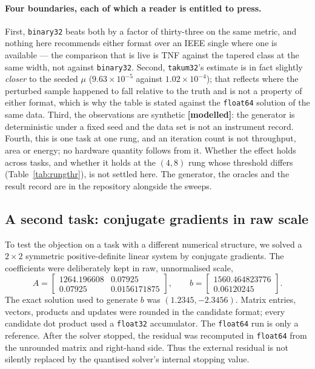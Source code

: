 \paragraph{Four boundaries, each of which a reader is entitled to press.}
First, \texttt{binary32} beats both by a factor of thirty-three on the same
metric, and nothing here recommends either format over an IEEE single where one is
available --- the comparison that is live is TNF against the tapered class at the
same width, not against \texttt{binary32}. Second, \texttt{takum32}'s estimate is
in fact slightly \emph{closer} to the seeded $\mu$ ($9.63\times 10^{-5}$ against
$1.02\times 10^{-4}$); that reflects where the perturbed sample happened to fall
relative to the truth and is not a property of either format, which is why the
table is stated against the \texttt{float64} solution of the same data. Third, the
observations are synthetic \textbf{[modelled]}: the generator is deterministic
under a fixed seed and the data set is not an instrument record. Fourth, this is
one task at one rung, and an iteration count is not throughput, area or energy;
no hardware quantity follows from it. Whether the effect holds across tasks, and
whether it holds at the $(4,8)$ rung whose threshold differs
(Table~\ref{tab:rungthr}), is not settled here. The generator, the oracles and the
result record are in the repository alongside the sweeps.

\subsection{A second task: conjugate gradients in raw scale}
\label{sec:downstream-cg}

To test the objection on a task with a different numerical structure, we solved a
$2\times2$ symmetric positive-definite linear system by conjugate gradients.
The coefficients were deliberately kept in raw, unnormalised scale,
\[
A=\begin{bmatrix}1264.196608&0.07925\\0.07925&0.0156171875\end{bmatrix},
\qquad
b=\begin{bmatrix}1560.464823776\\0.06120245\end{bmatrix}.
\]
The exact solution used to generate $b$ was $(1.2345,-2.3456)$. Matrix entries,
vectors, products and updates were rounded in the candidate format; every
candidate dot product used a \texttt{float32} accumulator. The \texttt{float64}
run is only a reference. After the solver stopped, the residual was recomputed
in \texttt{float64} from the unrounded matrix and right-hand side. Thus the
external residual is not silently replaced by the quantised solver's internal
stopping value.

